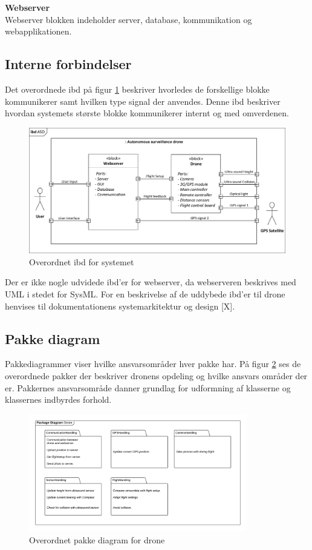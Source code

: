 \textbf{Webserver} \\
Webserver blokken indeholder server, database, kommunikation og webapplikationen.

\subsection{Interne forbindelser}
\vspace{-0.3cm}	
Det overordnede ibd på figur \ref{fig:ibd_asd} beskriver hvorledes de forskellige blokke kommunikerer samt hvilken type signal der anvendes.
Denne ibd beskriver hvordan systemets største blokke kommunikerer internt og med omverdenen. 

\begin{figure}[H]
	\centering
	\includegraphics[width=1\textwidth]{Billeder/Projektbeskrivelse/ibd1_overordnet.pdf}
	\caption{Overordnet ibd for systemet}
	\label{fig:ibd_asd}
\end{figure}

Der er ikke nogle udvidede ibd'er for webserver, da webserveren beskrives med UML i stedet for SysML. 
For en beskrivelse af de uddybede ibd'er til drone henvises til dokumentationens systemarkitektur og design [X].

\subsection{Pakke diagram}
\vspace{-0.3cm}	
Pakkediagrammer viser hvilke ansvarsområder hver pakke har.
På figur \ref{fig:package_drone} ses de overordnede pakker der beskriver dronens opdeling og hvilke ansvars områder der er.
Pakkernes ansvarsområde danner grundlag for udformning af klasserne og klassernes indbyrdes forhold.
 
\begin{figure}[H]
	\centering
	\includegraphics[width=0.85\textwidth]{Billeder/Projektbeskrivelse/Packagediagram_drone}
	\vspace{-0.3cm}	
	\caption{Overordnet pakke diagram for drone}
	\label{fig:package_drone}
\end{figure}
